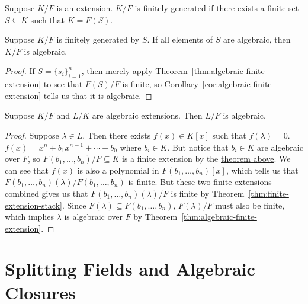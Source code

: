 \begin{definition}
    Suppose \(K/F\) is an extension.
    \(K/F\) is finitely generated if there exists a finite set \(S \subseteq K\)
    such that \(K = F(S)\).
\end{definition}
\begin{theorem}\label{thm:finitely-gen-algebraic}
    Suppose \(K/F\) is finitely generated by \(S\).
    If all elements of \(S\) are algebraic, then \(K/F\) is algebraic.
\end{theorem}
\begin{proof}
    If \(S = {\{s_i\}}_{i=1}^n\),
    then merely apply Theorem~\ref{thm:algebraic-finite-extension}
    to see that \(F(S)/F\) is finite,
    so Corollary~\ref{cor:algebraic-finite-extension}
    tells us that it is algebraic.
\end{proof}
\begin{corollary}\label{cor:algebraic-extension-stack}
    Suppose \(K/F\) and \(L/K\) are algebraic extensions.
    Then \(L/F\) is algebraic.
\end{corollary}
\begin{proof}
    Suppose \(\lambda \in L\).
    Then there exists \(f(x) \in K[x]\) such that \(f(\lambda) = 0\).
    \(f(x) = x^n + b_1 x^{n-1} + \cdots + b_0\) where \(b_i \in K\).
    But notice that \(b_i \in K\) are algebraic over \(F\),
    so \(F(b_1,\hdots,b_n)/F \subseteq K\) is a finite extension
    by the \hyperref[thm:finitely-gen-algebraic]{theorem above}.
    We can see that \(f(x)\) is also a polynomial in \(F(b_1,\hdots,b_n)[x]\),
    which tells us that \(F(b_1,\hdots,b_n)(\lambda)/F(b_1,\hdots,b_n)\) is finite.
    But these two finite extensions combined gives us that
    \(F(b_1,\hdots,b_n)(\lambda)/F\) is finite by Theorem~\ref{thm:finite-extension-stack}.
    Since \(F(\lambda) \subseteq F(b_1,\hdots,b_n)\),
    \(F(\lambda)/F\) must also be finite,
    which implies \(\lambda\) is algebraic over \(F\)
    by Theorem~\ref{thm:algebraic-finite-extension}.
\end{proof}


\section{Splitting Fields and Algebraic Closures}


